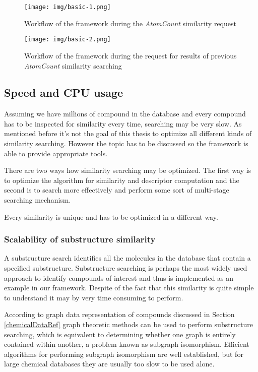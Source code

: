 \documentclass[thesis=M,english]{FITthesis}[2012/10/20]
\begin{document}
\begin{figure}
  \centering
  \texttt{[image: img/basic-1.png]}
  \caption{Workflow of the framework during the \textit{AtomCount} similarity request}
  \label{fig:basic-1}
\end{figure}

\begin{figure}
  \centering
  \texttt{[image: img/basic-2.png]}
  \caption{Workflow of the framework during the request for results of previous \textit{AtomCount} similarity searching}
  \label{fig:basic-2}
\end{figure}


\subsection{Speed and CPU usage}
Assuming we have millions of compound in the database and every compound has to be inspected for similarity every time, searching may be very slow. As mentioned before it’s not the goal of this thesis to optimize all different kinds of similarity searching. However the topic has to be discussed so the framework is able to provide appropriate tools.

There are two ways how similarity searching may be optimized. The first way is to optimize the algorithm for similarity and descriptor computation and the second is to search more effectively and perform some sort of multi-stage searching mechanism.

Every similarity is unique and has to be optimized in a different way.

\subsubsection{Scalability of substructure similarity}
A substructure search identifies all the molecules in the database that contain a specified substructure. Substructure searching is perhaps the most widely used approach to identify compounds of interest and thus is implemented as an example in our framework. Despite of the fact that this similarity is quite simple to understand it may by very time consuming to perform.

According to graph data representation of compounds discussed in Section \ref{chemicalDataRef} graph theoretic methods can be used to perform substructure searching, which is equivalent to determining whether one graph is entirely contained within another, a problem known as subgraph isomorphism. Efficient algorithms for performing subgraph isomorphism are well established, but for large chemical databases they are usually too slow to be used alone. 
\end{document}
